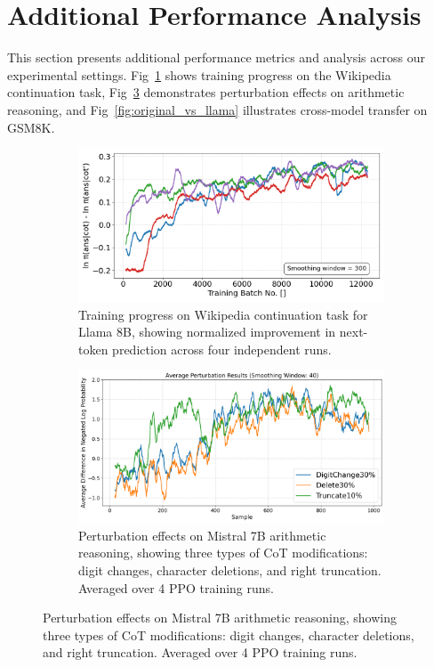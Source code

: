\documentclass{article}
\begin{document}
\newpage
\appendix
\onecolumn
\section{Additional Performance Analysis}
This section presents additional performance metrics and analysis across our experimental settings. Fig~\ref{fig:wikiloss} shows training progress on the Wikipedia continuation task, Fig~\ref{fig:faith_mistral} demonstrates perturbation effects on arithmetic reasoning, and Fig~\ref{fig:original_vs_llama} illustrates cross-model transfer on GSM8K.

\begin{figure}[ht]
    \centering
    \begin{subfigure}[b]{0.49\textwidth}
        \centering
        \includegraphics[width=\textwidth]{Figures/combined_metrics_wiki_continuation.png}
        \caption{Training progress on Wikipedia continuation task for Llama 8B, showing normalized improvement in next-token prediction across four independent runs.}
        \label{fig:wikiloss}
    \end{subfigure}
    \hfill
    \begin{subfigure}[b]{0.49\textwidth}
        \centering
        \includegraphics[width=\textwidth]{Figures/average_perturbation_results_plot_smooth40.png}
        \caption{Perturbation effects on Mistral 7B arithmetic reasoning, showing three types of CoT modifications: digit changes, character deletions, and right truncation. Averaged over 4 PPO training runs.}
        \label{fig:faith_mistral}
    \end{subfigure}
    

\end{figure}
\end{document}
